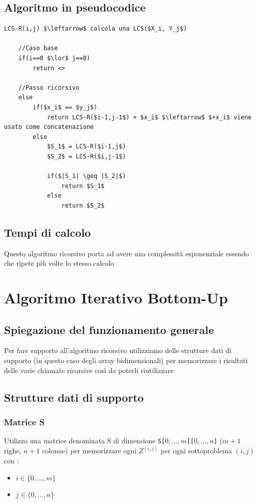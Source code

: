 \subsection{Algoritmo in pseudocodice}
\begin{lstlisting}[mathescape=true]
    LCS-R(i,j) $\leftarrow$ calcola una LCS($X_i, Y_j$)

    //Caso base
    if(i==0 $\lor$ j==0)
        return <>
    
    //Passo ricorsivo
    else
        if($x_i$ == $y_j$)
            return LCS-R($i-1,j-1$) + $x_i$ $\leftarrow$ $+x_i$ viene usato come concatenazione
        else
            $S_1$ = LCS-R($i-1,j$)
            $S_2$ = LCS-R($i,j-1$)

            if($|S_1| \geq |S_2|$)
                return $S_1$
            else
                return $S_2$
\end{lstlisting}

\subsection{Tempi di calcolo}
Questo algoritmo ricorsivo porta ad avere una complessità esponenziale essendo che ripete più volte lo stesso calcolo

\newpage
\section{Algoritmo Iterativo Bottom-Up}

\subsection{Spiegazione del funzionamento generale}
Per fare supporto all'algoritmo ricorsivo utilizziamo delle strutture dati di supporto (in questo caso degli array bidimensionali) per memorizzare i risultati delle varie chiamate ricorsive così da poterli riutilizzare

\subsection{Strutture dati di supporto}

\subsubsection{Matrice S}
Utilizzo una matrice denominata S di dimensione \texttt{S[$0, \dots, m$][$0, \dots, n$]} ($m+1$ righe, $n+1$ colonne) per memorizzare ogni $Z^{(i,j)}$ per ogni sottoproblema $(i,j)$ con :
\begin{itemize}
    \item $i \in \{0, \dots, m\}$
    \item $j \in \{0, \dots, n\}$
\end{itemize}

